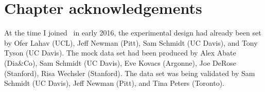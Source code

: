 %

\section*{Chapter acknowledgements}

At the time I joined \desc\ in early 2016, the experimental design had already been set by Ofer Lahav (UCL), Jeff Newman (Pitt), Sam Schmidt (UC Davis), and Tony Tyson (UC Davis).
The mock data set had been produced by Alex Abate (Dia\&Co), Sam Schmidt (UC Davis), Eve Kovacs (Argonne), Joe DeRose (Stanford), Risa Wechsler (Stanford).
The data set was being validated by Sam Schmidt (UC Davis), Jeff Newman (Pitt), and Tina Peters (Toronto).

